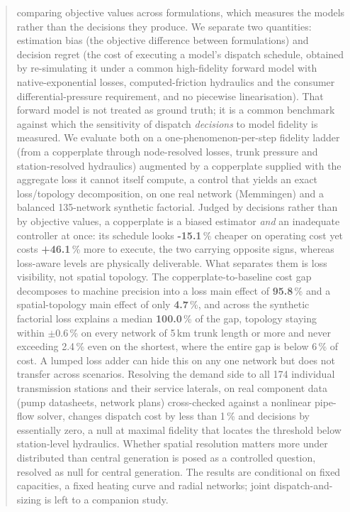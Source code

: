 \documentclass[a4paper,fleqn]{cas-sc}
\begin{document}
\begin{abstract}
comparing objective values across formulations, which measures the models rather than
the decisions they produce. We separate two quantities: estimation bias (the objective
difference between formulations) and decision regret (the cost of executing a model's
dispatch schedule, obtained by re-simulating it under a common high-fidelity forward
model with native-exponential losses, computed-friction hydraulics and the consumer
differential-pressure requirement, and no piecewise linearisation). That forward model is
not treated as ground truth; it is a common benchmark against which the sensitivity of
dispatch \emph{decisions} to model fidelity is measured. We evaluate both on
a one-phenomenon-per-step fidelity ladder (from a copperplate through node-resolved
losses, trunk pressure and station-resolved hydraulics) augmented by a copperplate
supplied with the aggregate loss it cannot itself compute, a control that yields an
exact loss/topology decomposition, on one real network (Memmingen) and a balanced
135-network synthetic factorial. Judged by decisions rather than by objective values, a
copperplate is a biased estimator \emph{and} an inadequate controller at once: its
schedule looks \textbf{-15.1}\,\% cheaper on operating cost yet costs
\textbf{+46.1}\,\% more to execute, the two carrying opposite signs, whereas
loss-aware levels are physically deliverable. What separates them is loss visibility, not
spatial topology. The copperplate-to-baseline cost gap decomposes to machine precision into
a loss main effect of \textbf{95.8}\,\% and a spatial-topology main effect of only
\textbf{4.7}\,\%, and across the synthetic factorial loss explains a median
\textbf{100.0}\,\% of the gap, topology staying within
$\pm$0.6\,\% on every network of 5\,km trunk length or more and never exceeding 2.4\,\% even
on the shortest, where the entire gap is below 6\,\% of cost. A lumped loss adder can hide
this on any one network but does not transfer across scenarios. Resolving the demand side to all 174
individual transmission stations and their service laterals, on real component data (pump
datasheets, network plans) cross-checked against a nonlinear pipe-flow solver, changes
dispatch cost by less than 1\,\% and decisions by essentially zero, a null at maximal
fidelity that locates the threshold below station-level hydraulics. Whether spatial
resolution matters more under distributed than central generation is posed as a controlled
question, resolved as null for central generation. The results are conditional on fixed
capacities, a fixed heating curve and radial networks; joint dispatch-and-sizing is left
to a companion study.
\end{abstract}
\end{document}
